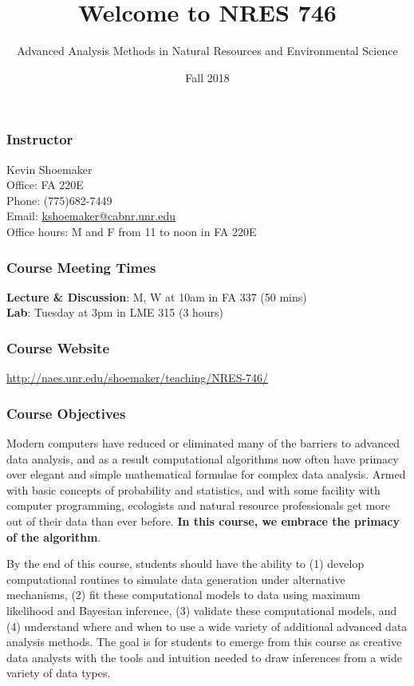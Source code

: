 \documentclass[]{article}
\title{Welcome to NRES 746}
\author{Advanced Analysis Methods in Natural Resources and Environmental Science}
\date{Fall 2018}
\begin{document}
\maketitle

\subsubsection{Instructor}\label{instructor}

Kevin Shoemaker\\
Office: FA 220E\\
Phone: (775)682-7449\\
Email: \url{kshoemaker@cabnr.unr.edu}\\
Office hours: M and F from 11 to noon in FA 220E

\subsubsection{Course Meeting Times}\label{course-meeting-times}

\textbf{Lecture \& Discussion}: M, W at 10am in FA 337 (50 mins)\\
\textbf{Lab}: Tuesday at 3pm in LME 315 (3 hours)

\subsubsection{Course Website}\label{course-website}

\href{http://naes.unr.edu/shoemaker/teaching/NRES-746/index.html}{http://naes.unr.edu/shoemaker/teaching/NRES-746/}

\subsubsection{Course Objectives}\label{course-objectives}

Modern computers have reduced or eliminated many of the barriers to
advanced data analysis, and as a result computational algorithms now
often have primacy over elegant and simple mathematical formulae for
complex data analysis. Armed with basic concepts of probability and
statistics, and with some facility with computer programming, ecologists
and natural resource professionals get more out of their data than ever
before. \textbf{In this course, we embrace the primacy of the
algorithm}.

By the end of this course, students should have the ability to (1)
develop computational routines to simulate data generation under
alternative mechanisms, (2) fit these computational models to data using
maximum likelihood and Bayesian inference, (3) validate these
computational models, and (4) understand where and when to use a wide
variety of additional advanced data analysis methods. The goal is for
students to emerge from this course as creative data analysts with the
tools and intuition needed to draw inferences from a wide variety of
data types.
\end{document}
